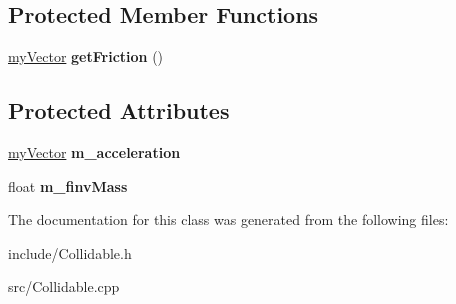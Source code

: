 \subsection*{Protected Member Functions}
\begin{DoxyCompactItemize}
\item 
\hypertarget{class_collidable_a5aaff018202f598eeefd6bc0968d5adb}{}\hyperlink{classmy_vector}{my\+Vector} {\bfseries get\+Friction} ()\label{class_collidable_a5aaff018202f598eeefd6bc0968d5adb}

\end{DoxyCompactItemize}
\subsection*{Protected Attributes}
\begin{DoxyCompactItemize}
\item 
\hypertarget{class_collidable_aacad0202ea0d4f51a6875bce682ff3eb}{}\hyperlink{classmy_vector}{my\+Vector} {\bfseries m\+\_\+acceleration}\label{class_collidable_aacad0202ea0d4f51a6875bce682ff3eb}

\item 
\hypertarget{class_collidable_a729958861685b10ff9718a24fca09c8e}{}float {\bfseries m\+\_\+finv\+Mass}\label{class_collidable_a729958861685b10ff9718a24fca09c8e}

\end{DoxyCompactItemize}


The documentation for this class was generated from the following files\+:\begin{DoxyCompactItemize}
\item 
include/Collidable.\+h\item 
src/Collidable.\+cpp\end{DoxyCompactItemize}
